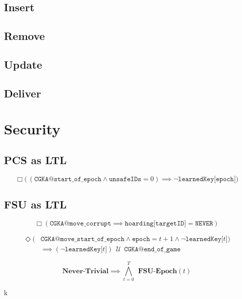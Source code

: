 \hypertarget{insert}{%
\subsection{Insert}\label{insert}}

\hypertarget{remove}{%
\subsection{Remove}\label{remove}}

\hypertarget{update}{%
\subsection{Update}\label{update}}

\hypertarget{deliver}{%
\subsection{Deliver}\label{deliver}}

\hypertarget{sec:LTL-security}{%
\section{Security}\label{sec:LTL-security}}

\hypertarget{pcs-as-ltl}{%
\subsection{PCS as LTL}\label{pcs-as-ltl}}

\begin{LTL}[\,PCS\,]
    $$
    \Box \Big(\, ( \texttt{CGKA@start\_of\_epoch} \land \texttt{unsafeIDs} = 0 ) \implies \neg \texttt{learnedKey[epoch]} \Big)
    $$
\end{LTL}

\hypertarget{fsu-as-ltl}{%
\subsection{FSU as LTL}\label{fsu-as-ltl}}

\begin{LTL}
    $$
    \Box \left( \texttt{CGKA@move\_corrupt} \implies \texttt{hoarding[targetID]} = \texttt{NEVER} \right)
    $$
\end{LTL}

\begin{LTL}
    \begin{equation*}
    \begin{split}
    \Diamond ( & \texttt{CGKA@move\_start\_of\_epoch} \land \texttt{epoch} = t + 1 \land \neg \texttt{learnedKey[$t$]} ) \\
    & \implies ( \neg \texttt{learnedKey[$t$]} ) \,\;{\mathcal {U}}\;\, \texttt{CGKA@end\_of\_game}
    \end{split}
    \end{equation*}
\end{LTL}

\begin{LTL}[\;FSU\;]
    $$
    \textbf{Never-Trivial} \implies \bigwedge\limits_{t=0}^{T} \;\,\textbf{FSU-Epoch}(t)
    $$
\end{LTL}
k
